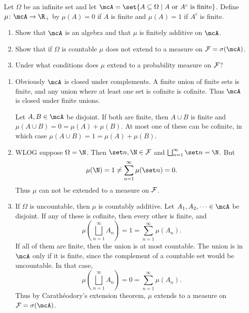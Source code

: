 \documentclass[12pt]{article}
\begin{document}
\begin{problem}
    Let $\Omega$ be an infinite set and let
    $\mcA = \set{A \subseteq \Omega
        \mid A \text{ or } A^c \text{ is finite}}$.
    Define $\mu\colon \mcA \to \R_+$ by $\mu(A) = 0$ if $A$ is finite
    and $\mu(A) = 1$ if $A^c$ is finite.
    \begin{enumerate}[(1)]
        \item Show that $\mcA$ is an algebra and that $\mu$ is finitely
        additive on $\mcA$.
        \item Show that if $\Omega$ is countable $\mu$ does not extend
        to a measure on $\F = \sigma(\mcA)$.
        \item Under what conditions does $\mu$
        extend to a probability measure on $\mathcal F$?
    \end{enumerate}
\end{problem}
\begin{solution} \leavevmode
    \begin{enumerate}
        \item Obviously $\mcA$ is closed under complements.
        A finite union of finite sets is finite, and
        any union where at least one set is cofinite is cofinite.
        Thus $\mcA$ is closed under finite unions.

        Let $A, B \in \mcA$ be disjoint.
        If both are finite, then $A \cup B$ is finite and
        $\mu(A \cup B) = 0 = \mu(A) + \mu(B)$.
        At most one of these can be cofinite, in which case
        $\mu(A \cup B) = 1 = \mu(A) + \mu(B)$.
        \item WLOG suppose $\Omega = \N$.
        Then $\set n, \N \in \F$ and $\bigsqcup_{n=1}^\infty \set n = \N$.
        But \[
            \mu(\N) = 1 \ne \sum_{n=1}^\infty \mu(\set n) = 0.
        \] Thus $\mu$ can not be extended to a measure on $\mathcal F$.
        \item If $\Omega$ is uncountable, then $\mu$ is countably additive.
        Let $A_1, A_2, \dots \in \mcA$ be disjoint.
        If any of these is cofinite, then every other is finite, and \[
            \mu\left(\bigsqcup_{n=1}^\infty A_n\right)
                = 1 = \sum_{n=1}^\infty \mu(A_n).
        \] If all of them are finite, then the union is at most countable.
        The union is in $\mcA$ only if it is finite, since the complement
        of a countable set would be uncountable.
        In that case, \[
            \mu\left(\bigsqcup_{n=1}^\infty A_n\right)
                = 0 = \sum_{n=1}^\infty \mu(A_n).
        \] Thus by
        {Carath\'eodory's extension theorem},
        $\mu$ extends to a measure on $\F = \sigma(\mcA)$. \qedhere
    \end{enumerate}
\end{solution}
\end{document}
